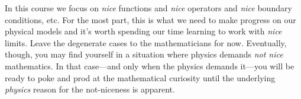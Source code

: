 In this course we focus on \emph{nice} functions and \emph{nice} operators and \emph{nice} boundary conditions, etc. For the most part, this is what we need to make progress on our physical models and it’s worth spending our time learning to work with \emph{nice} limits. Leave the degenerate cases to the mathematicians for now. Eventually, though, you may find yourself in a situation where physics demands \emph{not nice} mathematics. In that case---and only when the physics demands it---you will be ready to poke and prod at the mathematical curiosity until the underlying \emph{physics} reason for the not-niceness is apparent.

